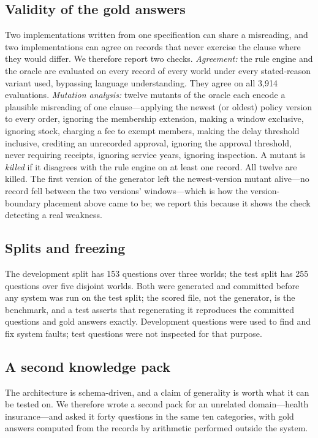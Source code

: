 \documentclass[11pt]{article}
\begin{document}
\subsection{Validity of the gold answers}
Two implementations written from one specification can share a misreading, and two
implementations can agree on records that never exercise the clause where they would
differ. We therefore report two checks. \emph{Agreement:} the rule engine and the oracle are
evaluated on every record of every world under every stated-reason variant used, bypassing
language understanding.
They agree on all 3{,}914 evaluations. \emph{Mutation analysis:} twelve mutants of the
oracle each encode a plausible misreading of one clause---applying the newest (or oldest)
policy version to every order, ignoring the membership extension, making a window
exclusive, ignoring stock, charging a fee to exempt members, making the delay threshold
inclusive, crediting an unrecorded approval, ignoring the approval threshold, never
requiring receipts, ignoring service years, ignoring inspection. A mutant is \emph{killed}
if it disagrees with the rule engine on at least one record. All twelve are killed. The
first version of the generator left the newest-version mutant alive---no record fell
between the two versions' windows---which is how the version-boundary placement above
came to be; we report this because it shows the check detecting a real weakness.

\subsection{Splits and freezing}
The development split has 153 questions over three worlds; the test split has 255
questions over five disjoint worlds. Both were generated and committed before any system
was run on the test split; the scored file, not the generator, is the benchmark, and a test
asserts that regenerating it reproduces the committed questions and gold answers exactly.
Development questions were used to find and fix system faults; test questions were not
inspected for that purpose.

\subsection{A second knowledge pack}\label{sec:second-domain}
The architecture is schema-driven, and a claim of generality is worth what it can be
tested on. We therefore wrote a second pack for an unrelated domain---health
insurance---and asked it forty questions in the same ten categories, with gold answers
computed from the records by arithmetic performed outside the system.
\end{document}
